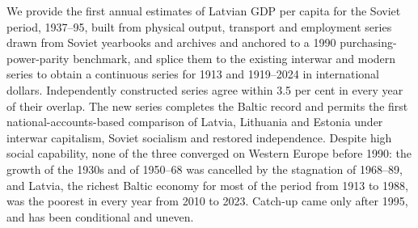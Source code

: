 We provide the first annual estimates of Latvian GDP per capita for the Soviet period, 1937--95, built from physical output, transport and employment series drawn from Soviet yearbooks and archives and anchored to a 1990 purchasing-power-parity benchmark, and splice them to the existing interwar and modern series to obtain a continuous series for 1913 and 1919--2024 in international dollars. Independently constructed series agree within 3.5 per cent in every year of their overlap. The new series completes the Baltic record and permits the first national-accounts-based comparison of Latvia, Lithuania and Estonia under interwar capitalism, Soviet socialism and restored independence. Despite high social capability, none of the three converged on Western Europe before 1990: the growth of the 1930s and of 1950--68 was cancelled by the stagnation of 1968--89, and Latvia, the richest Baltic economy for most of the period from 1913 to 1988, was the poorest in every year from 2010 to 2023. Catch-up came only after 1995, and has been conditional and uneven.
